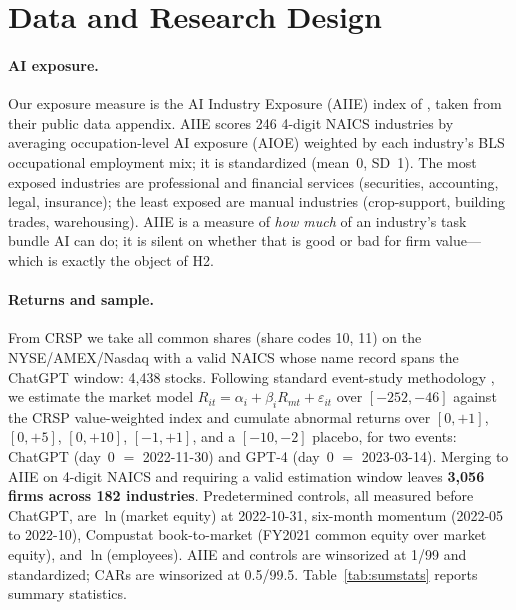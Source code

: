 \documentclass[12pt]{article}
\begin{document}
\section{Data and Research Design}\label{sec:data}
\paragraph{AI exposure.} Our exposure measure is the AI Industry Exposure (AIIE) index
of \citet{felten2021}, taken from their public data appendix. AIIE scores 246 4-digit
NAICS industries by averaging occupation-level AI exposure (AIOE) weighted by each
industry's BLS occupational employment mix; it is standardized (mean~0, SD~1). The most
exposed industries are professional and financial services (securities, accounting,
legal, insurance); the least exposed are manual industries (crop-support, building
trades, warehousing). AIIE is a measure of \emph{how much} of an industry's task bundle
AI can do; it is silent on whether that is good or bad for firm value---which is exactly
the object of H2.

\paragraph{Returns and sample.} From CRSP we take all common shares (share codes 10, 11)
on the NYSE/AMEX/Nasdaq with a valid NAICS whose name record spans the ChatGPT window:
4{,}438 stocks. Following standard event-study methodology \citep{brown1985,mackinlay1997}, we
estimate the market model $R_{it}=\alpha_i+\beta_i R_{mt}+
\varepsilon_{it}$ over $[-252,-46]$ against the CRSP value-weighted index and cumulate
abnormal returns over $[0,+1]$, $[0,+5]$, $[0,+10]$, $[-1,+1]$, and a $[-10,-2]$ placebo,
for two events: ChatGPT (day~0 $=$ 2022-11-30) and GPT-4 (day~0 $=$ 2023-03-14). Merging
to AIIE on 4-digit NAICS and requiring a valid estimation window leaves \textbf{3{,}056
firms across 182 industries}. Predetermined controls, all measured before ChatGPT, are
$\ln$(market equity) at 2022-10-31, six-month momentum (2022-05 to 2022-10), Compustat
book-to-market (FY2021 common equity over market equity), and $\ln$(employees). AIIE and
controls are winsorized at 1/99 and standardized; CARs are winsorized at 0.5/99.5.
Table~\ref{tab:sumstats} reports summary statistics.
\end{document}
